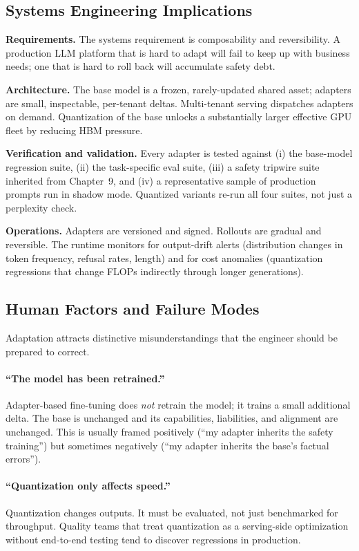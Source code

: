 \subsection{Systems Engineering Implications}

\textbf{Requirements.}
The systems requirement is composability and reversibility. A
production LLM platform that is hard to adapt will fail to keep up
with business needs; one that is hard to roll back will accumulate
safety debt.

\textbf{Architecture.}
The base model is a frozen, rarely-updated shared asset; adapters
are small, inspectable, per-tenant deltas. Multi-tenant serving
dispatches adapters on demand. Quantization of the base unlocks a
substantially larger effective GPU fleet by reducing HBM pressure.

\textbf{Verification and validation.}
Every adapter is tested against (i) the base-model regression suite,
(ii) the task-specific eval suite, (iii) a safety tripwire suite
inherited from Chapter~9, and (iv) a representative sample of
production prompts run in shadow mode. Quantized variants re-run all
four suites, not just a perplexity check.

\textbf{Operations.}
Adapters are versioned and signed. Rollouts are gradual and
reversible. The runtime monitors for output-drift alerts
(distribution changes in token frequency, refusal rates, length) and
for cost anomalies (quantization regressions that change FLOPs
indirectly through longer generations).

\subsection{Human Factors and Failure Modes}

Adaptation attracts distinctive misunderstandings that the engineer
should be prepared to correct.

\paragraph{``The model has been retrained.''}
Adapter-based fine-tuning does \emph{not} retrain the model; it
trains a small additional delta. The base is unchanged and its
capabilities, liabilities, and alignment are unchanged. This is
usually framed positively (``my adapter inherits the safety
training'') but sometimes negatively (``my adapter inherits the
base's factual errors'').

\paragraph{``Quantization only affects speed.''}
Quantization changes outputs. It must be evaluated, not just
benchmarked for throughput. Quality teams that treat quantization
as a serving-side optimization without end-to-end testing tend to
discover regressions in production.

